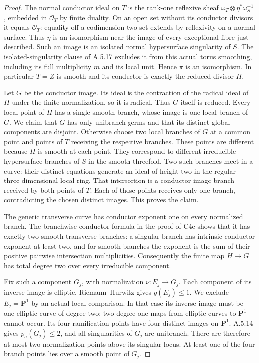 \begin{proof}
The normal conductor ideal on $T$ is the rank-one reflexive
sheaf $\omega_T\otimes\eta^*\omega_S^{-1}$, embedded in
$\mathcal O_T$ by finite duality. On an open set without
its conductor divisors it equals $\mathcal O_T$: equality
off a codimension-two set extends by reflexivity on a normal
surface. Thus $\eta$ is an isomorphism near the image of
every exceptional fibre just described. Such an image is
an isolated normal hypersurface singularity of $S$.
The isolated-singularity clause of A.5.17 excludes it from
this actual torus smoothing, including its full multiplicity
$m$ and its local unit. Hence $\pi$ is an isomorphism.
In particular $T=Z$ is smooth and its conductor is exactly
the reduced divisor $H$.

Let $G$ be the conductor image. Its ideal is the contraction
of the radical ideal of $H$ under the finite normalization,
so it is radical. Thus $G$ itself is reduced. Every local
point of $H$ has a single smooth branch, whose image is one
local branch of $G$. We claim that $G$ has only unibranch
germs and that its distinct global components are disjoint.
Otherwise choose two local branches of $G$ at a common point
and points of $T$ receiving the respective branches. These
points are different because $H$ is smooth at each point.
They correspond to different irreducible hypersurface
branches of $S$ in the smooth threefold. Two such branches
meet in a curve: their distinct equations generate an ideal
of height two in the regular three-dimensional local ring.
That intersection is a conductor-image branch received by
both points of $T$. Each of those points receives only one
branch, contradicting the chosen distinct images. This
proves the claim.

The generic transverse curve has conductor exponent one on
every normalized branch. The branchwise conductor formula
in the proof of C4e shows that it has exactly two smooth
transverse branches: a singular branch has intrinsic
conductor exponent at least two, and for smooth branches
the exponent is the sum of their positive pairwise
intersection multiplicities. Consequently the finite map
$H\to G$ has total degree two over every irreducible component.

Fix such a component $G_j$, with normalization
$\nu:E_j\to G_j$. Each component of its inverse image is
elliptic. Riemann--Hurwitz gives $g(E_j)\le1$.
We exclude $E_j=\mathbf P^1$ by an actual local comparison.
In that case its inverse image must be one elliptic curve
of degree two; two degree-one maps from elliptic curves to
$\mathbf P^1$ cannot occur. Its four ramification points
have four distinct images on $\mathbf P^1$. A.5.14 gives
$p_a(G_j)\le2$, and all singularities of $G_j$ are unibranch.
There are therefore at most two normalization points above
its singular locus. At least one of the four branch points
lies over a smooth point of $G_j$.


\end{proof}
